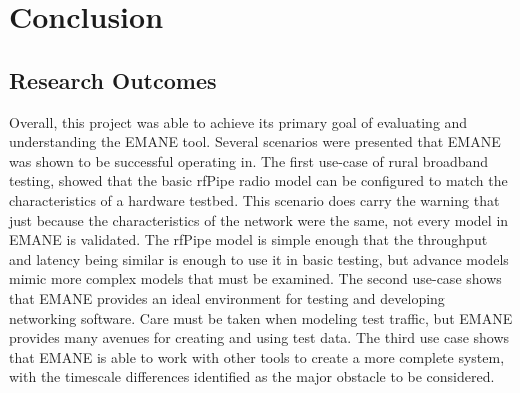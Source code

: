 \chapter{Conclusion}
\label{conclusion}
\section{Research Outcomes}
Overall, this project was able to achieve its primary goal of evaluating and understanding the EMANE tool.
Several scenarios were presented that EMANE was shown to be successful operating in.
The first use-case of rural broadband testing, showed that the basic rfPipe radio model can be configured to match the characteristics of a hardware testbed.
This scenario does carry the warning that just because the characteristics of the network were the same, not every model in EMANE is validated.
The rfPipe model is simple enough that the throughput and latency being similar is enough to use it in basic testing, but advance models mimic more complex models that must be examined.
The second use-case shows that EMANE provides an ideal environment for testing and developing networking software.
Care must be taken when modeling test traffic, but EMANE provides many avenues for creating and using test data.
The third use case shows that EMANE is able to work with other tools to create a more complete system, with the timescale differences identified as the major obstacle to be considered.

